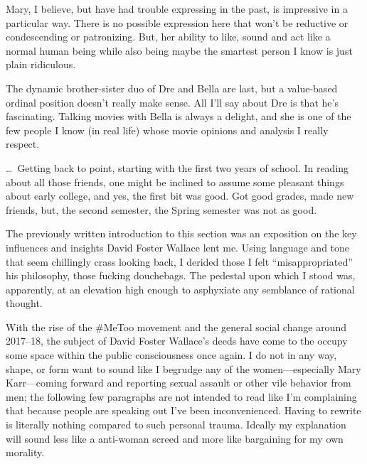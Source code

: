 \documentclass[./butidigress.tex]{subfiles}
\begin{document}
Mary, I believe, but have had trouble expressing in the past, is impressive in a particular way.
There is no possible expression here that won't be reductive or condescending or patronizing.
But, her ability to like, sound and act like a normal human being while also being maybe the smartest person I know is just plain ridiculous.

The dynamic brother-sister duo of Dre and Bella are last, but a value-based ordinal position doesn't really make sense.
All I'll say about Dre is that he's fascinating.
Talking movies with Bella is always a delight, and she is one of the few people I know (in real life) whose movie opinions and analysis I really respect.

\vspace*{\baselineskip}

\ldots\ Getting back to point, starting with the first two years of school.
In reading about all those friends, one might be inclined to assume some pleasant things about early college, and yes, the first bit was good.
Got good grades, made new friends, but, the second semester, the Spring semester was not as good.


\label{sec:influences}
The previously written introduction to this section was an exposition on the key influences and insights David Foster Wallace lent me.
Using language and tone that seem chillingly crass looking back, I derided those I felt ``misappropriated'' his philosophy, those fucking douchebags.
The pedestal upon which I stood was, apparently, at an elevation high enough to asphyxiate any semblance of rational thought.

With the rise of the \#MeToo movement and the general social change around 2017--18, the subject of David Foster Wallace's deeds have come to the occupy some space within the public consciousness once again.
I do not in any way, shape, or form want to sound like I begrudge any of the women---especially Mary Karr---coming forward and reporting sexual assault or other vile behavior from men; the following few paragraphs are not intended to read like I'm complaining that because people are speaking out I've been inconvenienced.
Having to rewrite is literally nothing compared to such personal trauma.
Ideally my explanation will sound less like a anti-woman screed and more like bargaining for my own morality.
\end{document}

